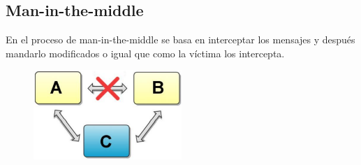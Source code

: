 \subsection{Man-in-the-middle}
En el proceso de man-in-the-middle se basa en interceptar los mensajes y después mandarlo modificados o igual que como la víctima los intercepta.
\begin{figure}[!h]
	\centering
	\includegraphics[width=0.5\textwidth]{figures/man.png}
\end{figure}


